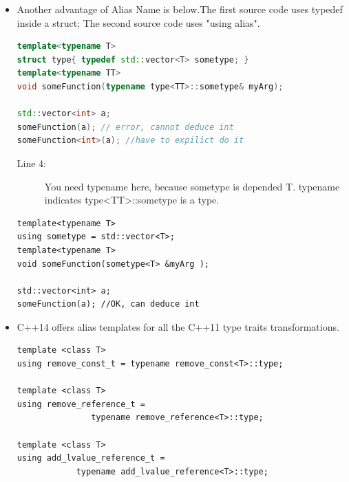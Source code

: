 \documentclass[a4paper,11pt,twoside]{book}
\begin{document}
\begin{itemize}
\item Another advantage of Alias Name is below.The first source code uses typedef inside a struct; The second source code uses "using alias".

\begin{lstlisting}[frame=single, language=c++]
template<typename T>
struct type{ typedef std::vector<T> sometype; }
template<typename TT>
void someFunction(typename type<TT>::sometype& myArg);

std::vector<int> a;
someFunction(a); // error, cannot deduce int
someFunction<int>(a); //have to expilict do it 
\end{lstlisting}
\begin{description}
	\item[Line 4:] You need typename here, because sometype is depended T. \newline typename indicates type<TT>::sometype is a type.
\end{description}

\begin{lstlisting}[numbers=none]
template<typename T>
using sometype = std::vector<T>;
template<typename T>
void someFunction(sometype<T> &myArg );

std::vector<int> a;
someFunction(a); //OK, can deduce int
\end{lstlisting}


\item C++14 offers alias templates for all the C++11 type traits transformations.
\begin{lstlisting}[numbers=none]
template <class T>
using remove_const_t = typename remove_const<T>::type;

template <class T>
using remove_reference_t = 
               typename remove_reference<T>::type;

template <class T>
using add_lvalue_reference_t = 
            typename add_lvalue_reference<T>::type;
\end{lstlisting}

\end{itemize}
\end{document}
